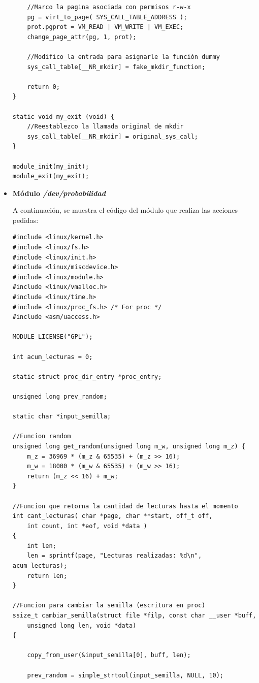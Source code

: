 \documentclass[a4paper,11pt] {article}
\begin{document}
\begin{itemize}
\begin{verbatim}
    //Marco la pagina asociada con permisos r-w-x
    pg = virt_to_page( SYS_CALL_TABLE_ADDRESS );
    prot.pgprot = VM_READ | VM_WRITE | VM_EXEC;
    change_page_attr(pg, 1, prot);
    
    //Modifico la entrada para asignarle la función dummy
    sys_call_table[__NR_mkdir] = fake_mkdir_function;

    return 0;
}

static void my_exit (void) {
    //Reestablezco la llamada original de mkdir
    sys_call_table[__NR_mkdir] = original_sys_call;
}

module_init(my_init);
module_exit(my_exit);
\end{verbatim}

	\item \textbf{Módulo \textit{/dev/probabilidad}}

	A continuación, se muestra el código del módulo que realiza las acciones pedidas:

\begin{verbatim}
#include <linux/kernel.h>
#include <linux/fs.h>
#include <linux/init.h>
#include <linux/miscdevice.h>
#include <linux/module.h>
#include <linux/vmalloc.h>
#include <linux/time.h>
#include <linux/proc_fs.h> /* For proc */
#include <asm/uaccess.h>

MODULE_LICENSE("GPL");

int acum_lecturas = 0;

static struct proc_dir_entry *proc_entry;

unsigned long prev_random;

static char *input_semilla;

//Funcion random
unsigned long get_random(unsigned long m_w, unsigned long m_z) {
    m_z = 36969 * (m_z & 65535) + (m_z >> 16);
    m_w = 18000 * (m_w & 65535) + (m_w >> 16);
    return (m_z << 16) + m_w;
}

//Funcion que retorna la cantidad de lecturas hasta el momento
int cant_lecturas( char *page, char **start, off_t off, 
    int count, int *eof, void *data ) 
{
    int len;
    len = sprintf(page, "Lecturas realizadas: %d\n", acum_lecturas);
    return len;
}

//Funcion para cambiar la semilla (escritura en proc)
ssize_t cambiar_semilla(struct file *filp, const char __user *buff, 
    unsigned long len, void *data) 
{

    copy_from_user(&input_semilla[0], buff, len);

    prev_random = simple_strtoul(input_semilla, NULL, 10);
    

\end{verbatim}
\end{itemize}
\end{document}
